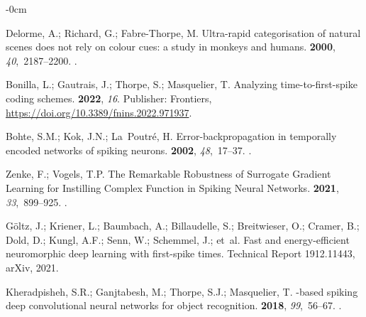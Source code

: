 \documentclass[brainsci, %
               review,submit,pdftex,moreauthors
               ]{Definitions/mdpi}
\begin{document}
\begin{adjustwidth}{-\extralength}{0cm}
\begin{thebibliography}{999}
  Delorme, A.; Richard, G.; Fabre-Thorpe, M.
  \newblock Ultra-rapid categorisation of natural scenes does not rely on colour
    cues: a study in monkeys and humans.
   {\bf 2000}, {\em 40},~2187--2200.
  .
  
  Bonilla, L.; Gautrais, J.; Thorpe, S.; Masquelier, T.
  \newblock Analyzing time-to-first-spike coding schemes.
   {\bf 2022}, {\em 16}.
  \newblock Publisher: Frontiers,
    {\url{https://doi.org/10.3389/fnins.2022.971937}}.
  
  Bohte, S.M.; Kok, J.N.; La~Poutré, H.
  \newblock Error-backpropagation in temporally encoded networks of spiking
    neurons.
   {\bf 2002}, {\em 48},~17--37.
  .
  
  Zenke, F.; Vogels, T.P.
  \newblock The {Remarkable} {Robustness} of {Surrogate} {Gradient} {Learning}
    for {Instilling} {Complex} {Function} in {Spiking} {Neural} {Networks}.
   {\bf 2021}, {\em 33},~899--925.
  .
  
  Göltz, J.; Kriener, L.; Baumbach, A.; Billaudelle, S.; Breitwieser, O.;
    Cramer, B.; Dold, D.; Kungl, A.F.; Senn, W.; Schemmel, J.;  et~al.
  \newblock Fast and energy-efficient neuromorphic deep learning with first-spike
    times.
  \newblock Technical Report 1912.11443, arXiv,  2021.
  
  Kheradpisheh, S.R.; Ganjtabesh, M.; Thorpe, S.J.; Masquelier, T.
  -based spiking deep convolutional neural networks for object
    recognition.
   {\bf 2018}, {\em 99},~56--67.
  .
  

\end{thebibliography}
\end{adjustwidth}
\end{document}
